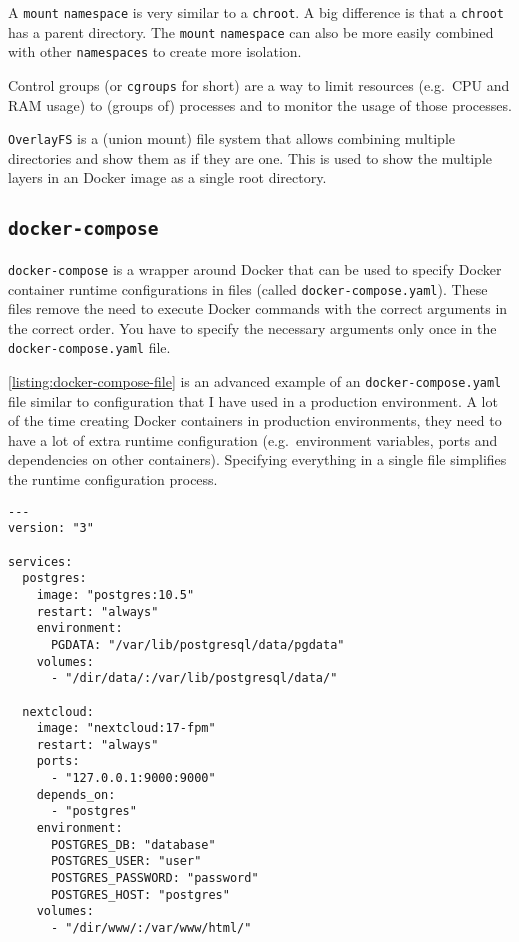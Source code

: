 A \lstinline{mount} \lstinline{namespace} is very similar to a \lstinline{chroot}. A big difference is that a \lstinline{chroot} has a parent directory. The \lstinline{mount} \lstinline{namespace} can also be more easily combined with other \lstinline{namespaces} to create more isolation.

\hfill

Control groups (or \lstinline{cgroups} for short) are a way to limit resources (e.g.\ CPU and RAM usage) to (groups of) processes and to monitor the usage of those processes.

\hfill

\lstinline{OverlayFS} is a (union mount) file system that allows combining multiple directories and show them as if they are one. This is used to show the multiple layers in an Docker image as a single root directory.


\subsection{\texorpdfstring{\lstinline{docker-compose}}{docker-compose}}
\lstinline{docker-compose} is a wrapper around Docker that can be used to specify Docker container runtime configurations in files (called \lstinline{docker-compose.yaml}). These files remove the need to execute Docker commands with the correct arguments in the correct order. You have to specify the necessary arguments only once in the \lstinline{docker-compose.yaml} file.

\hfill

\autoref{listing:docker-compose-file} is an advanced example of an \lstinline{docker-compose.yaml} file similar to configuration that I have used in a production environment. A lot of the time creating Docker containers in production environments, they need to have a lot of extra runtime configuration (e.g.\ environment variables, ports and dependencies on other containers). Specifying everything in a single file simplifies the runtime configuration process.
\begin{lstlisting}[caption={Example \lstinline{docker-compose.yaml}},label={listing:docker-compose-file},captionpos=b]
---
version: "3"

services:
  postgres:
    image: "postgres:10.5"
    restart: "always"
    environment:
      PGDATA: "/var/lib/postgresql/data/pgdata"
    volumes:
      - "/dir/data/:/var/lib/postgresql/data/"

  nextcloud:
    image: "nextcloud:17-fpm"
    restart: "always"
    ports:
      - "127.0.0.1:9000:9000"
    depends_on:
      - "postgres"
    environment:
      POSTGRES_DB: "database"
      POSTGRES_USER: "user"
      POSTGRES_PASSWORD: "password"
      POSTGRES_HOST: "postgres"
    volumes:
      - "/dir/www/:/var/www/html/"
\end{lstlisting}

